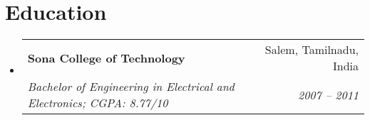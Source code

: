 \documentclass[letterpaper,11pt]{article}
\makeatletter
\newcommand{\resumeItem}[1]{
  \item\small{
    #1
  }
}
\newcommand{\resumeSubheading}[4]{
  \vspace{-1pt}\item
    \begin{tabular*}{0.97\textwidth}[t]{l@{\extracolsep{\fill}}r}
      \textbf{#1} & #2 \\
      \textit{\small#3} & \textit{\small #4} \\
    \end{tabular*}\vspace{-5pt}
}
\newcommand{\resumeSubItem}[2]{\resumeItem{#1}{#2}\vspace{-4pt}}
\newcommand{\resumeSubHeadingListStart}{\begin{itemize}[leftmargin=*]}
\newcommand{\resumeSubHeadingListEnd}{\end{itemize}}
\makeatother
\begin{document}


\section{Education}
  \resumeSubHeadingListStart
    \resumeSubheading
      {Sona College of Technology}{Salem, Tamilnadu, India}      
      {Bachelor of Engineering in Electrical and Electronics;  CGPA: 8.77/10}{2007 -- 2011}
  \resumeSubHeadingListEnd

\end{document}
